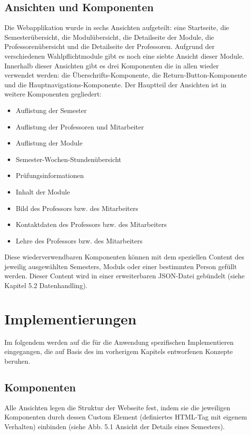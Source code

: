 \documentclass[12pt,					%
							 oneside,			%
							 a4paper,			%
							 halfparskip,		%
							 liststotoc,			%
							 bibtotoc,			%
							 fleqn,				%
							 pointlessnumbers]	%
							 {scrreprt}
\begin{document}
		\section{Ansichten und Komponenten}	
		 Die Webapplikation wurde in sechs Ansichten aufgeteilt: eine Startseite, die Semesterübersicht, die Modulübersicht, die Detailseite der Module, die Professorenübersicht und die Detailseite der Professoren. Aufgrund der verschiedenen Wahlpflichtmodule gibt es noch eine siebte Ansicht dieser Module. Innerhalb dieser Ansichten gibt es drei Komponenten die in allen wieder verwendet werden: die Überschrifts-Komponente, die Return-Button-Komponente und die Hauptnavigations-Komponente. Der Hauptteil der Ansichten ist in weitere Komponenten gegliedert:
	\begin{itemize}
		\item Auflistung der Semester
		\item Auflistung der Professoren und Mitarbeiter
		\item Auflistung der Module
		\item Semester-Wochen-Stundenübersicht
		\item Prüfungsinformationen
		\item Inhalt der Module
		\item Bild des Professors bzw. des Mitarbeiters
		\item Kontaktdaten des Professors bzw. des Mitarbeiters
		\item Lehre des Professors bzw. des Mitarbeiters
	\end{itemize}	
Diese wiederverwendbaren Komponenten können mit dem speziellen Content des jeweilig ausgewählten Semesters, Moduls oder einer bestimmten Person gefüllt werden. Dieser Content wird in einer erweiterbaren JSON-Datei gebündelt (siehe Kapitel 5.2 Datenhandling).



\chapter{Implementierungen}  
Im folgendem werden auf die für die Anwendung spezifischen Implementieren eingegangen, die auf Basis des im vorherigem Kapitels entworfenen Konzepte beruhen.

	\section{Komponenten}
	Alle Ansichten legen die Struktur der Webseite fest, indem sie die jeweiligen Komponenten durch dessen Custom Element (definiertes HTML-Tag mit eigenem Verhalten) einbinden (siehe Abb. 5.1 Ansicht der Details eines Semesters). 
	
\end{document}
